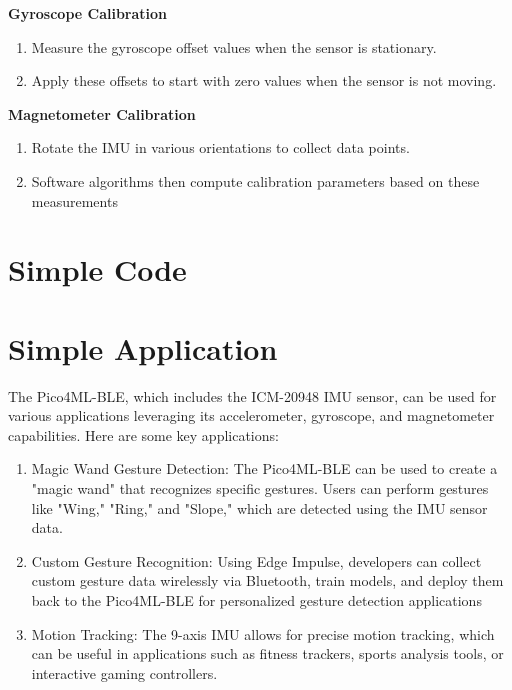 \textbf{Gyroscope Calibration}
\begin{enumerate}
	\item Measure the gyroscope offset values when the sensor is stationary.
	
	\item Apply these offsets to start with zero values when the sensor is not moving.\cite{Ewald:2021}
\end{enumerate}

\textbf{Magnetometer Calibration}

\begin{enumerate}
	\item Rotate the IMU in various orientations to collect data points.
	
	\item Software algorithms then compute calibration parameters based on these measurements
\end{enumerate}
\section{Simple Code}

\begin{code}[h!]
	\label{IMU:example}
\end{code}

\section{Simple Application}
The Pico4ML-BLE, which includes the ICM-20948 IMU sensor, can be used for various applications leveraging its accelerometer, gyroscope, and magnetometer capabilities. Here are some key applications:

\begin{enumerate}
	\item Magic Wand Gesture Detection: The Pico4ML-BLE can be used to create a "magic wand" that recognizes specific gestures. Users can perform gestures like "Wing," "Ring," and "Slope," which are detected using the IMU sensor data.\cite{arducam:2025}
	
	\item Custom Gesture Recognition: Using Edge Impulse, developers can collect custom gesture data wirelessly via Bluetooth, train models, and deploy them back to the Pico4ML-BLE for personalized gesture detection applications\cite{Arducam:2025b}
	
	\item Motion Tracking: The 9-axis IMU allows for precise motion tracking, which can be useful in applications such as fitness trackers, sports analysis tools, or interactive gaming controllers.
\end{enumerate}


